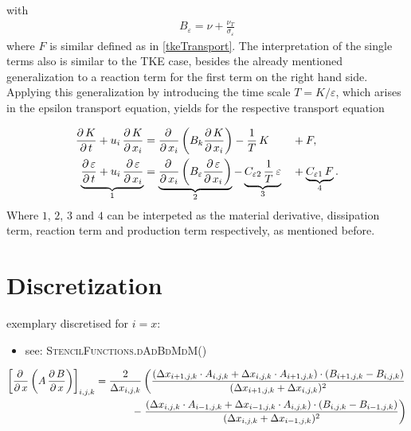 with
\begin{equation}
	\begin{split}
		B_\varepsilon = \nu + \frac{\nu_T}{\sigma_\varepsilon}
	\end{split}
\end{equation}
where $F$ is similar defined as in \eqref{tkeTransport}. The interpretation of the single terms also is similar to the TKE case, besides the already mentioned generalization to a reaction term for the first term on the right hand side. Applying this generalization by introducing the time scale $T = K/\varepsilon$, which arises in the epsilon transport equation, yields for the respective transport equation

\begin{alignat*}{3}
		\frac{\partial\,K}{\partial\,t} + u_i\,\frac{\partial\,K}{\partial\,x_i}
		&=
		\frac{\partial\,}{\partial\,x_i}\left(  B_k \frac{\partial\,K}{\partial\,x_i} \right) 
		-
		\frac{1}{T}\,K
		&&+
		F, \\
		\underbrace{\frac{\partial\,\varepsilon}{\partial\,t} + u_i\,\frac{\partial\,\varepsilon}{\partial\,x_i}}_{1}
		&=
		\underbrace{\frac{\partial\,}{\partial\,x_i}\left( B_\varepsilon \frac{\partial\,\varepsilon}{\partial\,x_i} \right)}_{2} 
		-
		\underbrace{C_{\varepsilon 2}\,\frac{1}{T}\,\varepsilon}_{3}
		&&+
		\underbrace{C_{\varepsilon 1}\,F}_{4}.
\end{alignat*}
Where $1$, $2$, $3$ and $4$ can be interpeted as the material derivative, dissipation term, reaction term and production term respectively, as mentioned before.



\section{Discretization} %
\label{sec:discretization}

exemplary discretised for $i=x$:
\begin{itemize}
\item see: \textsc{StencilFunctions.dAdBdMdM()}
\end{itemize}
\begin{align*}
\left[\frac{\partial\,}{\partial\,x}\left(A\,\frac{\partial\,B}{\partial\,x}\right)\right]_{i,j,k}
= \frac{2}{\Delta x_{i,j,k}}
\left( 
\frac{(\Delta x_{i+1,j,k}\cdot A_{i,j,k}+\Delta x_{i,j,k}\cdot A_{i+1,j,k}) \cdot (B_{i+1,j,k}-B_{i,j,k})}{(\Delta x_{i+1,j,k}+\Delta x_{i,j,k})^2} \right.\\
-\left.
\frac{(\Delta x_{i,j,k}\cdot A_{i-1,j,k}+\Delta x_{i-1,j,k}\cdot A_{i,j,k}) \cdot (B_{i,j,k}-B_{i-1,j,k})}{(\Delta x_{i,j,k}+\Delta x_{i-1,j,k})^2} 
\right)
\end{align*}

